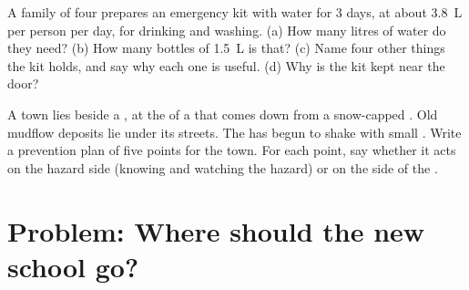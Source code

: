 \begin{exercise}[$\star\star\star$]\label{exo:g9:natural-risks:11}
A family of four prepares an emergency kit with water for 3 days, at
about \qty{3.8}{L} per person per day, for drinking and washing.
(a) How many litres of water do they need? (b) How many bottles of
\qty{1.5}{L} is that? (c) Name four other things the kit holds, and
say why each one is useful. (d) Why is the kit kept near the door?
\end{exercise}

\begin{exercise}[$\star\star\star$]\label{exo:g9:natural-risks:12}
A town lies beside a , at the  of a  that comes down
from a snow-capped . Old mudflow deposits lie under its streets.
The  has begun to shake with small . Write a
prevention plan of five points for the town. For each point, say
whether it acts on the hazard side (knowing and watching the hazard) or
on the  side of the .
\end{exercise}

\section{Problem: Where should the new school go?}

